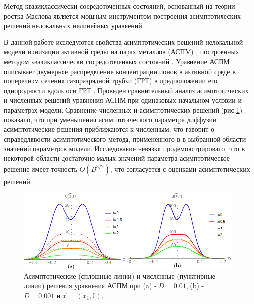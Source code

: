 
Метод квазиклассически сосредоточенных состояний, основанный на теории ростка Маслова является мощным инструментом построения асимптотических решений нелокальных нелинейных уравнений.

В данной работе исследуются свойства асимптотических решений нелокальной модели ионизации активной среды на парах металлов (АСПМ) \cite{Little}, построенных методом квазиклассически сосредоточенных состояний \cite{ShKulSin}. Уравнение АСПМ описывает двумерное распределение концентрации ионов в активной среде в поперечном сечении газоразрядной трубки (ГРТ) в предположении его однородности вдоль оси ГРТ \cite{CarBrPip}.  Проведен сравнительный анализ асимптотических и численных решений уравнения АСПМ при одинаковых начальном условии и параметрах модели. Сравнение численных и асимптотических решений (рис.\ref{fig1}) показало, что при уменьшении асимптотического параметра диффузии асимптотические решения приближаются к численным, что говорит о справедливости асимптотического метода, примененного в  \cite{ShKulSin} в выбранной области значений параметров модели. Исследование невязки продемонстрировало, что в некоторой области достаточно малых значений параметра   асимптотическое решение имеет точность $O(D^{3/2})$, что согласуется с оценками асимптотических решений.




\begin{figure}[htb]
  \centering

  \begin{center}
    \includegraphics[width=0.8\linewidth]{D01Resh.png}
  \end{center}
  \caption{Асимптотические (сплошные линии) и численные (пунктирные линии) решения уравнения АСПМ при (a) - $D=0.01$, (b) - $D=0.001$ и $\Vec{x}=(x_1,0)$.}\label{fig1}
\end{figure}


